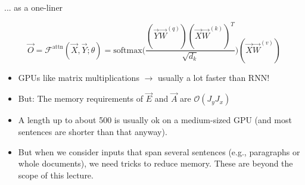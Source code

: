 
\begin{vbframe}{... as a one-liner}

\vfill

\large
$$ \vec O = \mathcal{F}^\mathrm{attn}(\vec X, \vec Y; \theta) = \mathrm{softmax}\Big(\frac{(\vec Y\vec W^{(q)} ) (\vec X\vec W^{(k)} )^T}{\sqrt{d_k}}\Big)(\vec X\vec W^{(v)} ) $$
\begin{itemize}
	\item GPUs like matrix multiplications $\rightarrow$ usually a lot faster than RNN!
	\item But: The memory requirements of $\vec E$ and $\vec A$ are $\mathcal{O}(J_y J_x)$
	\item A length up to about 500 is usually ok on a medium-sized GPU (and most sentences are shorter than that anyway).
	\item But when we consider inputs that span several sentences (e.g., paragraphs or whole documents), we need tricks to reduce memory. These are beyond the scope of this lecture.
\end{itemize}

\vfill

\end{vbframe}

